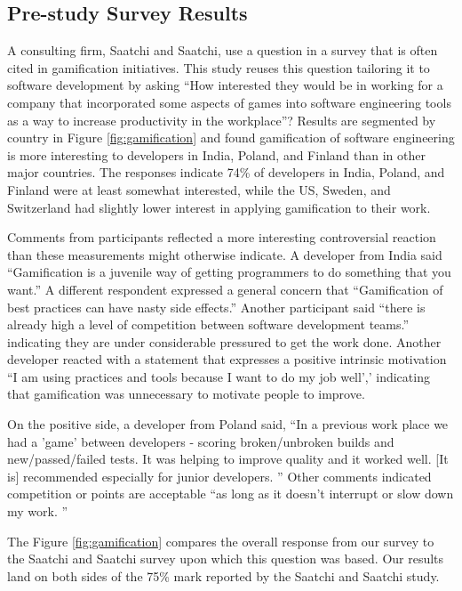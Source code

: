 \documentclass{sig-alternate}
\begin{document}
\subsection{Pre-study Survey Results}

A consulting firm, Saatchi and Saatchi, use a question in a survey that is often cited in gamification initiatives.  This study reuses this question \cite{wbsnipes:SaatchiGameification} tailoring it to software development by asking ``How interested they would be in working for a company that incorporated some aspects of games into software engineering tools as a way to increase productivity in the workplace''?  Results are segmented by country in Figure \ref{fig:gamification} and found gamification of software engineering is more interesting to developers in India, Poland, and Finland than in other major countries.  The responses indicate 74\% of developers in India, Poland, and Finland were at least somewhat interested, while the US, Sweden, and Switzerland had slightly lower interest in applying gamification to their work.

Comments from participants reflected a more interesting controversial reaction than these measurements might otherwise indicate.  A developer from India said ``Gamification is a juvenile way of getting programmers to do something that you want.''  A different respondent expressed a general concern that ``Gamification of best practices can have nasty side effects.''  Another participant said ``there is already high a level of competition between software development teams.'' indicating they are under considerable pressured to get the work done.  Another developer reacted with a statement that expresses a positive intrinsic motivation ``I am using practices and tools because I want to do my job well',' indicating that gamification was unnecessary to motivate people to improve.

On the positive side, a developer from Poland said, ``In a previous work place we had a 'game' between developers - scoring broken/unbroken builds and new/passed/failed tests. It was helping to improve quality and it worked well. [It is] recommended especially for junior developers. '' Other comments indicated competition or points are acceptable ``as long as it doesn't interrupt or slow down my work. ''

The Figure \ref{fig:gamification} compares the overall response from our survey to the Saatchi and Saatchi survey\cite{wbsnipes:SaatchiGameification} upon which this question was based.  Our results land on both sides of the 75\% mark reported by the Saatchi and Saatchi study.  
\end{document}
